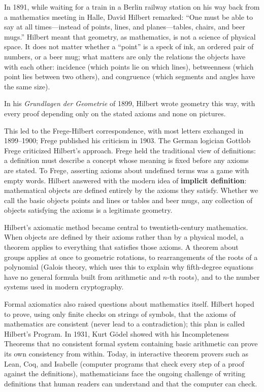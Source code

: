 \begin{historybox}
In 1891, while waiting for a train in a Berlin railway station on his way back from a mathematics meeting in Halle, David Hilbert remarked: ``One must be able to say at all times---instead of points, lines, and planes---tables, chairs, and beer mugs.'' Hilbert meant that geometry, as mathematics, is not a science of physical space. It does not matter whether a ``point'' is a speck of ink, an ordered pair of numbers, or a beer mug; what matters are only the relations the objects have with each other: incidence (which points lie on which lines), betweenness (which point lies between two others), and congruence (which segments and angles have the same size).

In his \emph{Grundlagen der Geometrie} of 1899, Hilbert wrote geometry this way, with every proof depending only on the stated axioms and none on pictures.

This led to the Frege-Hilbert correspondence, with most letters exchanged in 1899--1900; Frege published his criticism in 1903. The German logician Gottlob Frege criticized Hilbert's approach. Frege held the traditional view of definitions: a definition must describe a concept whose meaning is fixed before any axioms are stated. To Frege, asserting axioms about undefined terms was a game with empty words. Hilbert answered with the modern idea of \textbf{implicit definition}: mathematical objects are defined entirely by the axioms they satisfy. Whether we call the basic objects points and lines or tables and beer mugs, any collection of objects satisfying the axioms is a legitimate geometry.

Hilbert's axiomatic method became central to twentieth-century mathematics. When objects are defined by their axioms rather than by a physical model, a theorem applies to everything that satisfies those axioms. A theorem about groups applies at once to geometric rotations, to rearrangements of the roots of a polynomial (Galois theory, which uses this to explain why fifth-degree equations have no general formula built from arithmetic and $n$-th roots), and to the number systems used in modern cryptography.

Formal axiomatics also raised questions about mathematics itself. Hilbert hoped to prove, using only finite checks on strings of symbols, that the axioms of mathematics are consistent (never lead to a contradiction); this plan is called Hilbert's Program. In 1931, Kurt G\"odel showed with his Incompleteness Theorems that no consistent formal system containing basic arithmetic can prove its own consistency from within. Today, in interactive theorem provers such as Lean, Coq, and Isabelle (computer programs that check every step of a proof against the definitions), mathematicians face the ongoing challenge of writing definitions that human readers can understand and that the computer can check.
\end{historybox}


